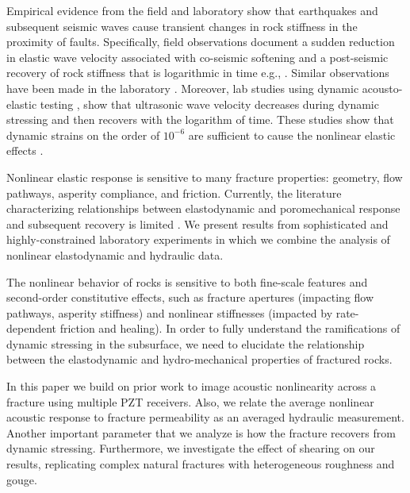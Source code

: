 \documentclass[draft]{agujournal2019}
\begin{document}
Empirical evidence from the field and laboratory show that earthquakes and subsequent seismic waves cause transient changes in rock stiffness in the proximity of faults. Specifically, field observations document a sudden reduction in elastic wave velocity associated with co-seismic softening and a post-seismic recovery of rock stiffness that is logarithmic in time e.g., \cite{Brenguier08}. Similar observations have been made in the laboratory \cite{Elkhoury11}. Moreover, lab studies using dynamic acousto-elastic testing \cite{Shokouhi17}, show that ultrasonic wave velocity decreases during dynamic stressing and then recovers with the logarithm of time. These studies show that dynamic strains on the order of $10^{-6}$ are sufficient to cause the nonlinear elastic effects \cite{Guyer09, Riviere15}.

Nonlinear elastic response is sensitive to many fracture properties: geometry, flow pathways, asperity compliance, and friction. Currently, the literature characterizing relationships between elastodynamic and poromechanical response and subsequent recovery is limited \cite{Shokouhi20}. We present results from sophisticated and highly-constrained  laboratory experiments in which we combine the analysis of nonlinear elastodynamic and hydraulic data.

The nonlinear behavior of rocks is sensitive to both fine-scale features and second-order constitutive effects, such as fracture apertures (impacting flow pathways, asperity stiffness) and nonlinear stiffnesses (impacted by rate-dependent friction and healing). In order to fully understand the ramifications of dynamic stressing in the subsurface, we need to elucidate the relationship between the elastodynamic and hydro-mechanical properties of fractured rocks.

In this paper we build on prior work \cite{Shokouhi20} to image acoustic nonlinearity across a fracture using multiple PZT receivers. Also, we relate the average nonlinear acoustic response to fracture permeability as an averaged hydraulic measurement. Another important parameter that we analyze is how the fracture recovers from dynamic stressing. Furthermore, we investigate the effect of shearing on our results, replicating complex natural fractures with heterogeneous roughness and gouge.    


\end{document}
